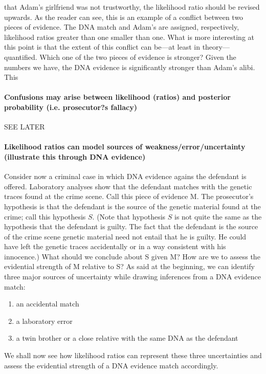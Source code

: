 \documentclass[10pt]{article}
\begin{document}
that Adam's girlfriend was not trustworthy, the likelihood ratio should be revised upwards. 
As the reader can see, this is an example of a conflict between two pieces of evidence. 
The DNA match and Adam's are assigned, respectively, likelihood ratios greater 
than one smaller than one. What is more interesting at this point is that the extent 
of this conflict can be---at least in theory---quantified. Which one of the two 
pieces of evidence is stronger? Given the numbers we have, the DNA evidence is 
significantly stronger than Adam's alibi. This 









\paragraph{Confusions may arise between likelihood (ratios) and posterior probability (i.e. prosecutor?s fallacy)}
SEE LATER

\paragraph{Likelihood ratios can model sources of weakness/error/uncertainty (illustrate this through DNA evidence)}

		
Consider now a criminal case in which DNA evidence agains the defendant is offered. Laboratory analyses show that the defendant matches with the genetic traces 
found at the crime scene. Call this piece of evidence M. The prosecutor's hypothesis is that the defendant is the source of the genetic 
material found at the crime; call this hypothesis $S$. 
(Note that hypothesis $S$ is not quite the same as the hypothesis that the defendant is guilty. The fact that the defendant is the source of the crime 
scene genetic material need not entail that he is guilty. He could have left the genetic traces accidentally 
or in a way consistent with his innocence.) What should we conclude about S given M?
How are we to assess the evidential strength of M relative to S?
As said at the beginning, we can identify three major sources of uncertainty 
while drawing inferences from a DNA evidence match:
%
\begin{enumerate}
\item an accidental match
\item a laboratory error
\item a twin brother or a close relative with the same DNA as the defendant 
\end{enumerate}
%
We shall now see how likelihood ratios can represent  
these three uncertainties and assess the evidential strength of a DNA 
evidence match accordingly. 
\end{document}
